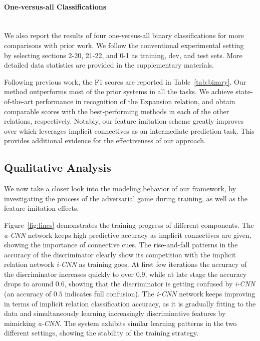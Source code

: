 \documentclass[11pt,a4paper]{article}
\begin{document}
\paragraph{One-versus-all Classifications}\quad\\
%
We also report the results of four one-versus-all binary classifications for more comparisons with prior work. We follow the conventional experimental setting~\cite{pitler-louis-nenkova:2009:ACLIJCNLP} by selecting sections 2-20, 21-22, and 0-1 as training, dev, and test sets. More detailed data statistics are provided in the supplementary materials.

Following previous work, the F1 scores are reported in Table~\ref{tab:binary}. Our method outperforms most of the prior systems in all the tasks. We achieve state-of-the-art performance in recognition of the Expansion relation, and obtain comparable scores with the best-performing methods in each of the other relations, respectively. Notably, our feature imitation scheme greatly improves over \cite{zhou2010predicting} which leverages implicit connectives as an intermediate prediction task. This provides additional evidence for the effectiveness of our approach.


\subsection{Qualitative Analysis}
We now take a closer look into the modeling behavior of our framework, by investigating the process of the adversarial game during training, as well as the feature imitation effects.

Figure~\ref{fig:lines} demonstrates the training progress of different components. The {\it a-CNN} network keeps high predictive accuracy as implicit connectives are given, showing the importance of connective cues.
The rise-and-fall patterns in the accuracy of the discriminator clearly show its competition with the implicit relation network {\it i-CNN} as training goes. At first few iterations the accuracy of the discriminator increases quickly to over $0.9$, while at late stage the accuracy drops to around $0.6$, showing that the discriminator is getting confused by {\it i-CNN} (an accuracy of $0.5$ indicates full confusion). 
The {\it i-CNN} network keeps improving in terms of implicit relation classification accuracy, as it is gradually fitting to the data and simultaneously learning increasingly discriminative features by mimicking {\it a-CNN}. The system exhibits similar learning patterns in the two different settings, showing the stability of the training strategy.
\end{document}
